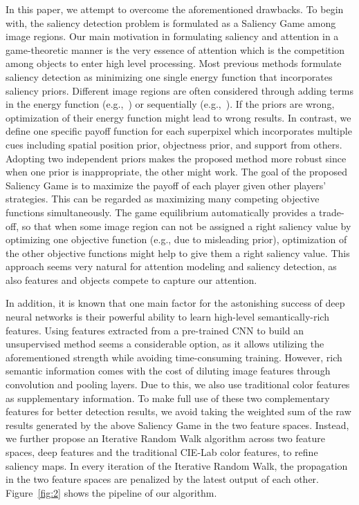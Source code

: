 \documentclass[journal]{IEEEtran}
\begin{document}
In this paper, we attempt to overcome the aforementioned drawbacks. To begin with, the saliency detection problem is formulated as a Saliency Game among image regions. Our main motivation in formulating saliency and attention in a game-theoretic manner is the very essence of attention which is the competition among objects to enter high level processing. Most previous methods formulate saliency detection as minimizing one single energy function that incorporates saliency priors. Different image regions are often considered through adding terms in the energy function (e.g.,~\cite{zhu2014saliency}) or sequentially (e.g.,~\cite{yang2013saliency}). If the priors are wrong, optimization of their energy function might lead to wrong results. In contrast, we define one specific payoff function for each superpixel which incorporates multiple cues including spatial position prior, objectness prior, and support from others. Adopting two independent priors makes the proposed method more robust since when one prior is inappropriate, the other might work. The goal of the proposed Saliency Game is to maximize the payoff of each player given other players’ strategies. This can be regarded as maximizing many competing objective functions simultaneously. The game equilibrium automatically provides a trade-off, so that when some image region can not be assigned a right saliency value by optimizing one objective function (e.g., due to misleading prior), optimization of the other objective functions might help to give them a right saliency value. This approach seems very natural for attention modeling and saliency detection, as also features and objects compete to capture our attention.  

In addition, it is known that one main factor for the astonishing success of deep neural networks is their powerful ability to learn high-level semantically-rich features. Using features extracted from a pre-trained CNN to build an unsupervised method seems a considerable option, as it allows utilizing the aforementioned strength while avoiding time-consuming training. However, rich semantic information comes with the cost of diluting image features through convolution and pooling layers. Due to this, we also use traditional color features as supplementary information. To make full use of these two complementary features for better detection results, we avoid taking the weighted sum of the raw results generated by the above Saliency Game in the two feature spaces. Instead, we further propose an Iterative Random Walk algorithm across two feature spaces, deep features and the traditional CIE-Lab color features, to refine saliency maps. In every iteration of the Iterative Random Walk, the propagation in the two feature spaces are penalized by the latest output of each other. Figure~\ref{fig:2} shows the pipeline of our algorithm. 
\end{document}
